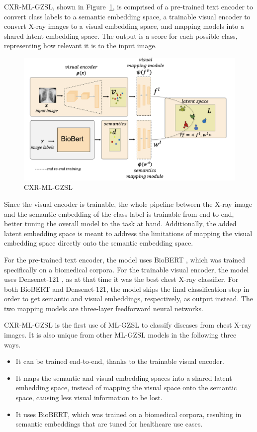 \documentclass[letterpaper]{article} %
\begin{document}
CXR-ML-GZSL, shown in Figure~\ref{fig:model}, is comprised of a pre-trained text encoder to convert class labels to a semantic embedding space, a trainable visual encoder to convert X-ray images to a visual embedding space, and mapping models into a shared latent embedding space. The output is a score for each possible class, representing how relevant it is to the input image.

\begin{figure}[h!]
\centering
\includegraphics[width=0.9\columnwidth]{model.png}
\caption{CXR-ML-GZSL \cite{hayat2021multilabel}}
\label{fig:model}
\end{figure}

Since the visual encoder is trainable, the whole pipeline between the X-ray image and the semantic embedding of the class label is trainable from end-to-end, better tuning the overall model to the task at hand. Additionally, the added latent embedding space is meant to address the limitations of mapping the visual embedding space directly onto the semantic embedding space.

For the pre-trained text encoder, the model uses BioBERT \cite{10.1093/bioinformatics/btz682}, which was trained specifically on a biomedical corpora. For the trainable visual encoder, the model uses Densenet-121 \cite{rajpurkar2017chexnetradiologistlevelpneumoniadetection}, as at that time it was the best chest X-ray classifier. For both BioBERT and Densenet-121, the model skips the final classification step in order to get semantic and visual embeddings, respectively, as output instead. The two mapping models are three-layer feedforward neural networks.

CXR-ML-GZSL is the first use of ML-GZSL to classify diseases from chest X-ray images. It is also unique from other ML-GZSL models in the following three ways.

\begin{itemize}
    \item It can be trained end-to-end, thanks to the trainable visual encoder.
    \item It maps the semantic and visual embedding spaces into a shared latent embedding space, instead of mapping the visual space onto the semantic space, causing less visual information to be lost.
    \item It uses BioBERT, which was trained on a biomedical corpora, resulting in semantic embeddings that are tuned for healthcare use cases.
\end{itemize}
\end{document}
